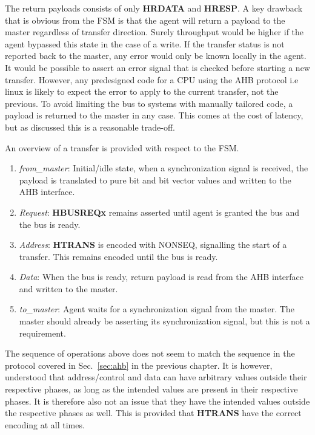 The return payloads consists of only \textbf{HRDATA} and \textbf{HRESP}. A key drawback that is obvious from the FSM is that the agent will return a payload 
to the master regardless of transfer direction. Surely throughput would be higher if the agent bypassed this state in the case of a write. If the transfer
status is not reported back to the master, any error would only be known locally in the agent. It would be possible to assert an error signal that is checked 
before starting a new transfer. However, any predesigned code for a CPU using the AHB protocol i.e linux is likely to expect the error to apply to the current transfer, not the previous. To avoid limiting the bus to systems with manually tailored code, a payload is returned to the master in any case. This comes
at the cost of latency, but as discussed this is a reasonable trade-off. \par
An overview of a transfer is provided with respect to the FSM.
\begin{enumerate}
 \item \textit{from\_master}: Initial/idle state, when a synchronization signal is received, the payload is translated to pure bit and bit vector values and written to the AHB interface.
 \item \textit{Request}: \textbf{HBUSREQx} remains asserted until agent is granted the bus and the bus is ready.
 \item \textit{Address}: \textbf{HTRANS} is encoded with NONSEQ, signalling the start of a transfer. This remains encoded until the bus is ready.
 \item \textit{Data}: When the bus is ready, return payload is read from the AHB interface and written to the master.
 \item \textit{to\_master}: Agent waits for a synchronization signal from the master. The master should already be asserting its synchronization signal, but this is not a requirement.   
\end{enumerate}

The sequence of operations above does not seem to match the sequence in the protocol covered in Sec.~\ref{sec:ahb} in the previous chapter. It is however, 
understood that address/control and data can have arbitrary values outside their respective phases, as long as the intended values are present in their 
respective phases. It is therefore also not an issue that they have the intended values outside the respective phases as well. This is provided that \textbf{HTRANS} have the correct encoding at all times. 
\newpage 

